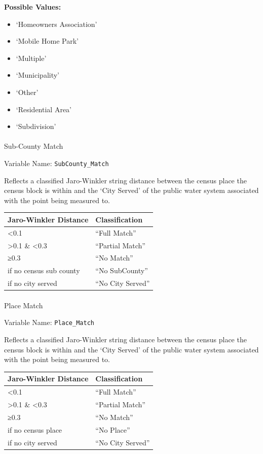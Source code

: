 \documentclass[12pt]{article}
\makeatletter
\providecommand{\tightlist}{%
  \setlength{\itemsep}{0pt}\setlength{\parskip}{0pt}}
\let\oldparagraph\paragraph
\renewcommand{\paragraph}{
    \@ifstar
      \xxxParagraphStar
      \xxxParagraphNoStar
  }
\newcommand{\xxxParagraphStar}[1]{\oldparagraph*{#1}\mbox{}}
\newcommand{\xxxParagraphNoStar}[1]{\oldparagraph{#1}\mbox{}}
\makeatother
\begin{document}
\textbf{Possible Values:}

\begin{itemize}
\tightlist
\item
  `Homeowners Association'
\item
  `Mobile Home Park'
\item
  `Multiple'
\item
  `Municipality'
\item
  `Other'
\item
  `Residential Area'
\item
  `Subdivision'
\end{itemize}

\paragraph{Sub-County Match}\label{sub-county-match}

Variable Name: \texttt{SubCounty\_Match}

Reflects a classified Jaro-Winkler string distance between the census
place the census block is within and the `City Served' of the public
water system associated with the point being measured to.

\begin{longtable}[]{@{}ll@{}}
\toprule\noalign{}
Jaro-Winkler Distance & Classification \\
\midrule\noalign{}
\endhead
\bottomrule\noalign{}
\endlastfoot
\textless0.1 & ``Full Match'' \\
\textgreater0.1 \& \textless0.3 & ``Partial Match'' \\
≥0.3 & ``No Match'' \\
if no census sub county & ``No SubCounty'' \\
if no city served & ``No City Served'' \\
\end{longtable}

\paragraph{Place Match}\label{place-match}

Variable Name: \texttt{Place\_Match}

Reflects a classified Jaro-Winkler string distance between the census
place the census block is within and the `City Served' of the public
water system associated with the point being measured to.

\begin{longtable}[]{@{}ll@{}}
\toprule\noalign{}
Jaro-Winkler Distance & Classification \\
\midrule\noalign{}
\endhead
\bottomrule\noalign{}
\endlastfoot
\textless0.1 & ``Full Match'' \\
\textgreater0.1 \& \textless0.3 & ``Partial Match'' \\
≥0.3 & ``No Match'' \\
if no census place & ``No Place'' \\
if no city served & ``No City Served'' \\
\end{longtable}
\end{document}
